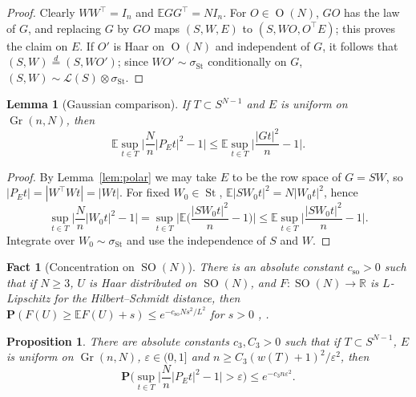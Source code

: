 \documentclass[11pt]{article}
\newtheorem{proposition}[theorem]{Proposition}
\newtheorem{lemma}[theorem]{Lemma}
\newtheorem{fact}[theorem]{Fact}
\newcommand{\R}{\mathbb{R}}
\newcommand{\E}{\mathbb{E}}
\newcommand{\Prob}{\mathbf{P}}
\newcommand{\eps}{\varepsilon}
\DeclareMathOperator{\Gr}{Gr}
\DeclareMathOperator{\St}{St}
\DeclareMathOperator{\SO}{SO}
\DeclareMathOperator{\Ort}{O}
\newcommand{\cso}{c_{\mathrm{so}}}
\begin{document}
\begin{proof}
Clearly $WW^\top=I_n$ and $\E GG^\top=NI_n$. For $O\in\Ort(N)$, $GO$ has the law of $G$, and replacing $G$ by $GO$ maps $(S,W,E)$ to $(S,WO,O^\top E)$; this proves the claim on $E$. If $O'$ is Haar on $\Ort(N)$ and independent of $G$, it follows that $(S,W)\overset{d}{=}(S,WO')$; since $WO'\sim\sigma_{\St}$ conditionally on $G$, $(S,W)\sim\mathcal L(S)\otimes\sigma_{\St}$.
\end{proof}

\begin{lemma}[Gaussian comparison]\label{lem:compare}
If $T\subset S^{N-1}$ and $E$ is uniform on $\Gr(n,N)$, then
\[
\E\sup_{t\in T}\Big|\frac Nn|P_Et|^2-1\Big|\le\E\sup_{t\in T}\Big|\frac{|Gt|^2}n-1\Big|.
\]
\end{lemma}

\begin{proof}
By Lemma~\ref{lem:polar} we may take $E$ to be the row space of $G=SW$, so $|P_Et|=|W^\top Wt|=|Wt|$. For fixed $W_0\in\St$, $\E|SW_0t|^2=N|W_0t|^2$, hence
\[
\sup_{t\in T}\Big|\frac Nn|W_0t|^2-1\Big|=\sup_{t\in T}\Big|\E\Big(\frac{|SW_0t|^2}n-1\Big)\Big|\le\E\sup_{t\in T}\Big|\frac{|SW_0t|^2}n-1\Big|.
\]
Integrate over $W_0\sim\sigma_{\St}$ and use the independence of $S$ and $W$.
\end{proof}

\begin{fact}[Concentration on $\SO(N)$]\label{fact:SO}
There is an absolute constant $\cso>0$ such that if $N\ge3$, $U$ is Haar distributed on $\SO(N)$, and $F:\SO(N)\to\R$ is $L$-Lipschitz for the Hilbert--Schmidt distance, then $\Prob(F(U)\ge\E F(U)+s)\le e^{-\cso Ns^2/L^2}$ for $s>0$ \cite{GromovMilman}, \cite[Thm.~5.17]{Meckes}.
\end{fact}

\begin{proposition}\label{prop:haar}
There are absolute constants $c_3,C_3>0$ such that if $T\subset S^{N-1}$, $E$ is uniform on $\Gr(n,N)$, $\eps\in(0,1]$ and $n\ge C_3(w(T)+1)^2/\eps^2$, then
\[
\Prob\Big(\sup_{t\in T}\Big|\frac Nn|P_Et|^2-1\Big|>\eps\Big)\le e^{-c_3n\eps^2}.
\]
\end{proposition}
\end{document}
